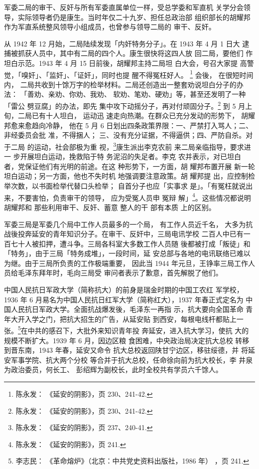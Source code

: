 军委二局的审干、反奸与所有军委直属单位一样，受总学委和军直机
关学分会领导，实际领导者仍是康生。当时年仅二十九岁、担任总政治部
组织部长的胡耀邦作为军直系统整风领导小组成员，也曾参与领导二局的
审干、反奸。

从 1942 年 12 月始，二局陆续发现「内奸特务分子」。在 1943 年 4 月 1 日大
逮捕被抓获人员中，其中有二局的四个人。康生很快将这四人放 回二局，要他们
作坦白示范。1943 年 4 月 15 日前後，胡耀邦主持二局坦 白大会，号召大家提
高警觉，「嗅奸」、「监奸」、「证奸」，同时也提 醒不得冤枉好人。
\footnote{陈永发： 《延安的阴影》，页 230、241-42.} 会後， 在很短时间内，
二局共收到十馀万字的检举材料。二局还创造出一整套劝说坦白分子的办法：
「善劝、亲劝、你劝、我劝、 软劝、笔劝、硬劝」等，甚至还发明了一种「雷公
劈豆腐」的办法，即先 集中攻下动摇分子，再对付顽固分子。\footnote{陈永发：
《延安的阴影》，页 230、241-42.} 到 5 月上旬，二局已有十人坦白， 运动迅
速走向热潮。在群众已充分发动的形势下， 胡耀邦愈来愈趋向冷静， 他在 5 月
6 日划出四条政策界限：一、严禁打入骂人；二、非经委员会批 准，不得捆人；
三、没有充分证据，不得逼供；四、严防自杀。对于二局 的运动，社会部极为重
视，\footnote{陈永发： 《延安的阴影》，页 237、240-41.}康生派出李克农前
来二局亲临指导，要求进一 步开展坦白运动，挽救陷于特 务泥沼的失足者。李克
农并表示，对已坦白 者，党保证他们有光明的前途。在这 种形势下，一方面，胡
耀邦布置开展 新一轮坦白运动；另一方面，他也不失时机 地强调要注意政策。胡
耀邦提 出，应控制检举次数，以书面检举代替口头检举； 自首分子也应「实事求
是」。「有冤枉就说出来，不要害怕，负责审干的领导， 应为受冤人员申 冤辩
解」\footnote{陈永发： 《延安的阴影》，页 241.}。这些情况都说明胡耀邦和
那些利用审干、反奸、蓄意 整人的干 部有本质 上的区别。

军委三局是军委几个局中工作人员最多的一个局，
有工作人员近千名，
大多为抗战後投奔延安的青年知识分子。在审干、反奸中，三局电讯学校
二百人中已有一百七十人被扣押，遭斗争。三局各科室大多数工作人员随
後都被打成「叛徒」和「特务」，由于三局「特务成堆」，一段时间，延
安总部与各地的电讯联络已难以为继。由于三局所负责的工作极端重要，
因此当 1944 年元旦，王铮率三局工作人员给毛泽东拜年时，毛向三局受
审问者表示了歉意，首先解脱了他们。

中国人民抗日军政大学（简称抗大）的前身是瑞金时期的中国工农红 军学校，
1936 年 6 月易名为中国人民抗日红军大学（简称红大），1937 年春正式定名为
中国人民抗日军政大学。全面抗战爆发後，毛泽东一再指 示，抗大要向全国革命
青年大开入学之门，把抗大招生的广告，从延安贴 到西安，每根电线杆都贴上一
张。\footnote{李志民： 《革命熔炉》（北京：中共党史资料出版社，1986 年）
，页 241.}在中共的感召下，大批外来知识青年投 奔延安，进入抗大学习，使抗
大的规模不断扩大。1939 年 6 月，因边区粮 食困难，中央政治局决定抗大总校
转移到晋东南，1943 年春，延安又命令 抗大总校返回陕甘宁边区，移驻绥德，并
将延安军事学院、抗大两个分校 等合并于抗大总校，任命徐向前为抗大校长，李
井泉为政治委员，何长工、 彭绍辉为副校长，此时全校共有学员六千馀人。

